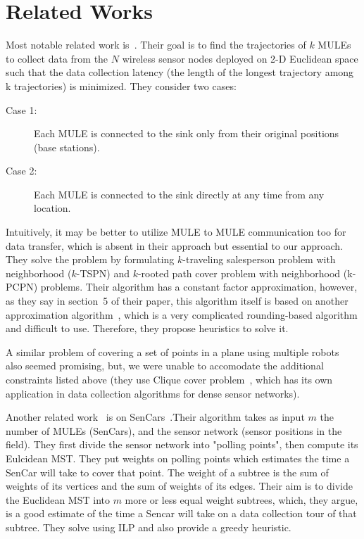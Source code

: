\chapter{Related Works}
Most notable related work is~\cite{sim}. Their goal is to find the trajectories of $k$ MULEs to collect data from the $N$ wireless sensor nodes deployed on 2-D Euclidean space such that the data collection latency (the length of the longest trajectory among k trajectories) is minimized. They consider two cases: 
\begin{description}
\item[Case 1:] Each MULE is connected to the sink only from their original positions (base stations).
\item[Case 2:] Each MULE is connected to the sink directly at any time from any location.
\end{description}
Intuitively, it may be better to utilize MULE to MULE communication too for data transfer, which is absent in their approach but essential to our approach. They solve the problem by formulating $k$-traveling salesperson problem with neighborhood ($k$-TSPN) and $k$-rooted path cover problem with neighborhood (k-PCPN) problems. Their algorithm has a constant factor approximation, however, as they say in section~5 of their paper, this algorithm itself is based on another approximation algorithm~\cite{supportSim}, which is a very complicated rounding-based algorithm and difficult to use. Therefore, they propose heuristics to solve it.

A similar problem of covering a set of points in a plane using multiple robots~\cite{roboPlan} also seemed promising, but, we were unable to accomodate the additional constraints listed above (they use Clique cover problem~\cite{minCliquePartition}, which has its own application in data collection algorithms for dense sensor networks).

Another related work~\cite{sim4} is on SenCars~\cite{sencar}.Their algorithm takes as input $m$ the number of MULEs (SenCars), and the sensor network (sensor positions in the field). They first divide the sensor network into "polling points", then compute its Eulcidean MST. They put weights on polling points which estimates the time a SenCar will take to cover that point. The weight of a subtree is the sum of weights of its vertices and the sum of weights of its edges. Their aim is to divide the Euclidean MST into $m$ more or less equal weight subtrees, which, they argue, is a good estimate of the time a Sencar will take on a data collection tour of that subtree. They solve using ILP and also provide a greedy heuristic.

